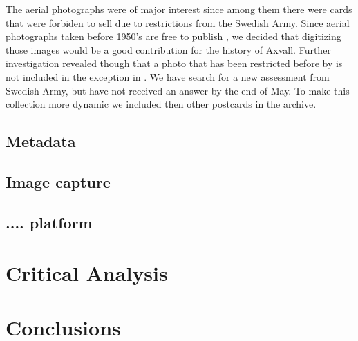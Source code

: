 \documentclass[12 pt]{paper}
\begin{document}
The aerial photographs were of major interest since among them there were cards that were forbiden to sell due to restrictions from the Swedish Army. Since aerial photographs taken before 1950's are free to publish \autocite[][kap. 3, 3§]{lantm2018}, we decided that digitizing those images would be a good contribution for the history of Axvall. Further investigation revealed though that a photo that has been restricted before by is not included in the exception in \textcite{lantm2018}. We have search for a new assessment from Swedish Army, but have not received an answer by the end of May. To make this collection more dynamic we included then other postcards in the archive.
\subsection{Metadata}
\subsection{Image capture}
\subsection{.... platform}%

\section {Critical Analysis}


\section{Conclusions}


\newpage

%
%
\printbibliography
\end{document}
